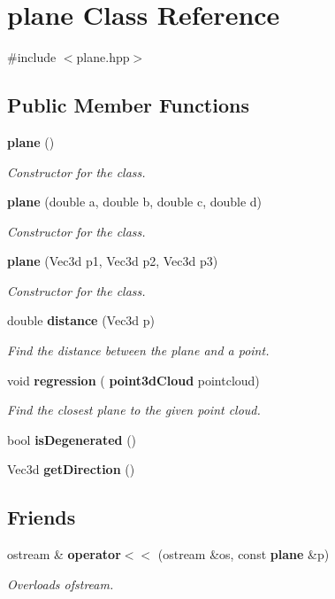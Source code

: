 \section{plane Class Reference}
\label{classplane}


{\ttfamily \#include $<$plane.\+hpp$>$}

\subsection*{Public Member Functions}
\begin{DoxyCompactItemize}
\item 
\textbf{ plane} ()
\begin{DoxyCompactList}\small\item\em Constructor for the class. \end{DoxyCompactList}\item 
\textbf{ plane} (double a, double b, double c, double d)
\begin{DoxyCompactList}\small\item\em Constructor for the class. \end{DoxyCompactList}\item 
\textbf{ plane} (Vec3d p1, Vec3d p2, Vec3d p3)
\begin{DoxyCompactList}\small\item\em Constructor for the class. \end{DoxyCompactList}\item 
double \textbf{ distance} (Vec3d p)
\begin{DoxyCompactList}\small\item\em Find the distance between the plane and a point. \end{DoxyCompactList}\item 
void \textbf{ regression} (\textbf{ point3d\+Cloud} pointcloud)
\begin{DoxyCompactList}\small\item\em Find the closest plane to the given point cloud. \end{DoxyCompactList}\item 
bool \textbf{ is\+Degenerated} ()
\item 
Vec3d \textbf{ get\+Direction} ()
\end{DoxyCompactItemize}
\subsection*{Friends}
\begin{DoxyCompactItemize}
\item 
ostream \& \textbf{ operator$<$$<$} (ostream \&os, const \textbf{ plane} \&p)
\begin{DoxyCompactList}\small\item\em Overloads ofstream. \end{DoxyCompactList}\end{DoxyCompactItemize}


